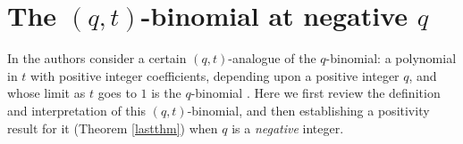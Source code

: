 \documentclass[10pt]{amsart}
\theoremstyle{plain}
\newtheorem{proposition}[theorem]{Proposition}
\theoremstyle{definition}
\theoremstyle{remark}
\numberwithin{equation}{section}
\begin{document}
%





\section{The $(q,t)$-binomial at negative $q$}
\label{q-t-section}

In \cite[p. 43]{RSW} the authors consider a certain
$(q,t)$-analogue of the $q$-binomial: a polynomial in $t$ 
with positive integer coefficients, depending upon
a positive integer $q$, and whose limit as $t$ goes to $1$
is the $q$-binomial \cite[Corollary 3.2]{RS}. 
Here we first review the definition and interpretation
of this $(q,t)$-binomial, and then 
establishing a positivity result for it (Theorem \ref{lastthm})
when $q$ is a {\it negative} integer.
\end{document}
